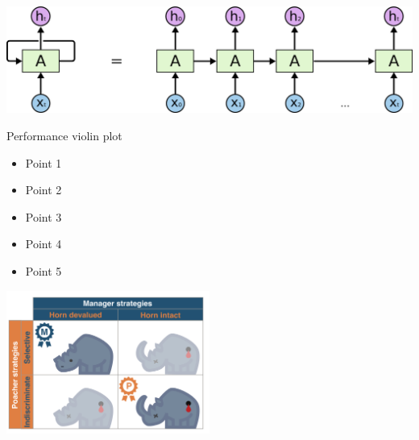 \documentclass{beamer}
\begin{document}
\begin{frame}
    \begin{center}
    \includegraphics[width=.9\textwidth]{static/Diagram_lstm.png}
    \end{center}
\end{frame}

\begin{frame}
    \begin{center}
    Performance violin plot
    \end{center}
\end{frame}
\begin{frame}
    \begin{center}
        \begin{itemize}
            \item Point 1
            \item Point 2
            \item Point 3
            \item Point 4
            \item Point 5
        \end{itemize}
    \end{center}
\end{frame}

\begin{frame}
    \begin{center}
    \includegraphics[width=0.5\textwidth]{static/RhinoPic.pdf}\hspace{12pt}
     \\
    \end{center}
\end{frame}
\end{document}
